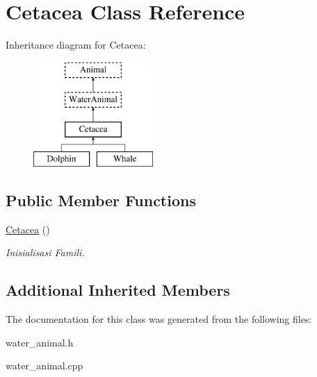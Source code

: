 \hypertarget{class_cetacea}{}\section{Cetacea Class Reference}
\label{class_cetacea}
Inheritance diagram for Cetacea\+:\begin{figure}[H]
\begin{center}
\leavevmode
\includegraphics[height=4.000000cm]{class_cetacea}
\end{center}
\end{figure}
\subsection*{Public Member Functions}
\begin{DoxyCompactItemize}
\item 
\hyperlink{class_cetacea_ad9c2b11696160f981eafffcddc041f70}{Cetacea} ()\hypertarget{class_cetacea_ad9c2b11696160f981eafffcddc041f70}{}\label{class_cetacea_ad9c2b11696160f981eafffcddc041f70}

\begin{DoxyCompactList}\small\item\em Inisialisasi Famili. \end{DoxyCompactList}\end{DoxyCompactItemize}
\subsection*{Additional Inherited Members}


The documentation for this class was generated from the following files\+:\begin{DoxyCompactItemize}
\item 
water\+\_\+animal.\+h\item 
water\+\_\+animal.\+cpp\end{DoxyCompactItemize}
